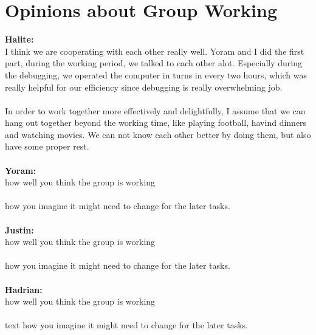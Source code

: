 \documentclass[a4paper]{article}
\begin{document}
\section{Opinions about Group Working}
\textbf{Halite:}\\
I think we are cooperating with each other really well. Yoram and I did the first part, during the working period, we talked to each other alot. Especially during the debugging, we operated the computer in turns in every two hours, which was really helpful for our efficiency since debugging is really overwhelming job.\\\\
In order to work together more effectively and delightfully, I assume that we can hang out together beyond the working time, like playing football, havind dinners and watching movies. We can not know each other better by doing them, but also have some proper rest.\\
\\
\textbf{Yoram:}\\
 how well you think the group is working
\\\\
how you imagine it might need to change for the later tasks.\\
\\
\textbf{Justin:}\\
 how well you think the group is working
\\\\
how you imagine it might need to change for the later tasks.\\
\\
\textbf{Hadrian:}\\
 how well you think the group is working
\\\\
text
how you imagine it might need to change for the later tasks.
\end{document}
